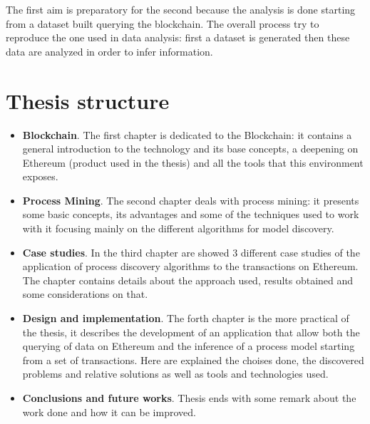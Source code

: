 The first aim is preparatory for the second because the analysis is done starting from a dataset built querying the blockchain. 
The overall process try to reproduce the one used in data analysis: first a dataset is generated then these data are analyzed 
in order to infer information.


\section{Thesis structure}
\label{introduction:structure}
\begin{itemize}

   \item \textbf{Blockchain}.
   The first chapter is dedicated to the Blockchain: it contains a general introduction to the technology and its base
   concepts, a deepening on Ethereum (product used in the thesis) and all the tools that this environment exposes.
   
   \item \textbf{Process Mining}.
   The second chapter deals with process mining: it presents some basic concepts, its advantages and some of the techniques 
   used to work with it focusing mainly on the different algorithms for model discovery.

   \item \textbf{Case studies}.
   In the third chapter are showed 3 different case studies of the application of process discovery algorithms to the transactions 
   on Ethereum. The chapter contains details about the approach used, results obtained and some considerations on that.

   \item \textbf{Design and implementation}.
   The forth chapter is the more practical of the thesis, it describes the development of an application that allow both the 
   querying of data on Ethereum and the inference of a process model starting from a set of transactions. Here are explained 
   the choises done, the discovered problems and relative solutions as well as tools and technologies used.

   \item \textbf{Conclusions and future works}.
   Thesis ends with some remark about the work done and how it can be improved.
   
\end{itemize}